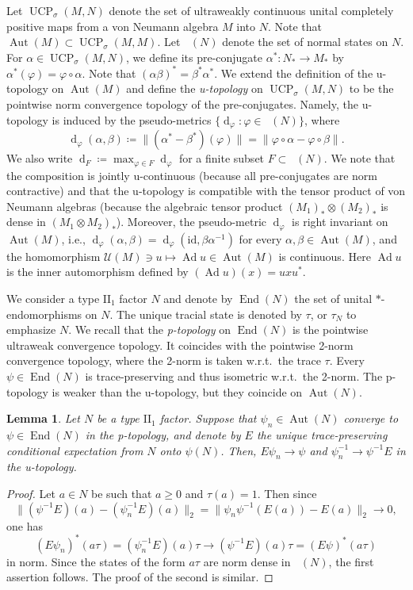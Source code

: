 \documentclass[12pt,nosumlimits,nonamelimits]{amsart}
\newtheorem{lem}[thm]{Lemma}
\theoremstyle{remark}
\newcommand{\cU}{\mathcal{U}}
\newcommand{\vp}{\varphi}
\newcommand{\id}{\mathrm{id}}
\DeclareMathOperator{\Aut}{Aut}
\DeclareMathOperator{\Ad}{Ad}
\newcommand{\ns}{\mathop{\mathcal{S}_{\mathrm{n}}}}
\DeclareMathOperator{\dist}{d}
\DeclareMathOperator{\UCP}{UCP}
\DeclareMathOperator{\End}{End}
\begin{document}
Let $\UCP_\sigma(M,N)$ denote the set of ultraweakly 
continuous unital completely positive maps from a von Neumann 
algebra $M$ into $N$. Note that $\Aut(M)\subset\UCP_\sigma(M,M)$. 
Let $\ns(N)$ denote the set of normal states on $N$. 
For $\alpha\in\UCP_\sigma(M,N)$, we define its pre-conjugate 
$\alpha^*\colon N_*\to M_*$ by 
$\alpha^*(\vp)=\vp\circ\alpha$. 
Note that $(\alpha\beta)^*=\beta^*\alpha^*$.
We extend the definition of the u-topo\-logy on $\Aut(M)$ and 
define the \emph{u-topo\-logy} on $\UCP_\sigma(M,N)$ to be 
the pointwise norm convergence topology of the pre-conjugates. 
Namely, the u-topo\-logy is induced by the pseudo-metrics 
$\{ \dist_\vp : \vp\in \ns(N)\}$, where 
\[
\dist_\vp(\alpha,\beta) \coloneqq \|(\alpha^*-\beta^*)(\vp)\|
 =\|\vp\circ\alpha-\vp\circ\beta\|. 
\]
We also write $\dist_F\coloneqq\max_{\vp\in F}\dist_\vp$ 
for a finite subset $F\subset \ns(N)$. 
We note that the composition is jointly u-con\-ti\-nuous 
(because all pre-conjugates are norm contractive) 
and that the u-topo\-logy is compatible with the tensor product of von Neumann 
algebras (because the algebraic tensor product $(M_1)_*\otimes (M_2)_*$ is 
dense in $(M_1\otimes M_2)_*$). 
Moreover, the pseudo-metric $\dist_\vp$ is right invariant on $\Aut(M)$, i.e., 
$\dist_\vp(\alpha,\beta)=\dist_\vp(\id,\beta\alpha^{-1})$ 
for every $\alpha,\beta\in\Aut(M)$, and the homomorphism 
$\cU(M)\ni u\mapsto\Ad u\in \Aut(M)$ is continuous. 
Here $\Ad u$ is the inner automorphism 
defined by $(\Ad u)(x)=uxu^*$. 

We consider a type $\mathrm{II}_1$ factor $N$ 
and denote by $\End(N)$ the set 
of unital $*$-endo\-mor\-phisms on $N$. 
The unique tracial state 
is denoted by $\tau$, or $\tau_N$ to emphasize $N$. 
We recall that the \emph{p-topo\-logy} on $\End(N)$ is 
the pointwise ultraweak convergence topology. 
It coincides with the pointwise 2-norm convergence topology, 
where the 2-norm is taken w.r.t.\ the trace $\tau$.  
Every $\psi\in\End(N)$ is trace-preserving and thus 
isometric w.r.t.\ the 2-norm. 
The p-topo\-logy is weaker than the u-topo\-logy, 
but they coincide on $\Aut(N)$. 

\begin{lem}\label{lem:p}
Let $N$ be a type $\mathrm{II}_1$ factor. 
Suppose that $\psi_n\in\Aut(N)$ converge 
to $\psi\in\End(N)$ in the p-topo\-logy, 
and denote by $E$ the unique trace-preserving conditional 
expectation from $N$ onto $\psi(N)$. 
Then, $E\psi_n\to\psi$ and $\psi_n^{-1}\to\psi^{-1}E$ in the u-topo\-logy. 
\end{lem}
\begin{proof}
Let $a\in N$ be such that $a\geq0$ and $\tau(a)=1$. 
Then since 
\[
\| (\psi^{-1}E)(a) - (\psi_n^{-1}E)(a) \|_2 = \| \psi_n\psi^{-1} (E(a)) - E(a) \|_2\to0,
\]
one has 
\[
(E\psi_n)^*(a\tau)=(\psi_n^{-1}E)(a)\tau \to (\psi^{-1}E)(a)\tau=(E\psi)^*(a\tau)
\]
in norm. 
Since the states of the form $a\tau$ are norm dense in $\ns(N)$, 
the first assertion follows. The proof of the second is similar. 
\end{proof}
\end{document}
